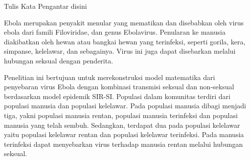 \documentclass{SkripsiUnesa}
\begin{document}
	\linespread{1.15}



\Awal
\HalamanJudul
\SampulDalam
\HalamanPersetujuan
\HalamanPengesahan
\SuratPernyataan
\newpage
\KataPengantar

Tulis Kata Pengantar disini

\begin{Abstrak}
	Ebola merupakan penyakit menular yang mematikan dan disebabkan oleh virus ebola dari famili Filoviridae, dan genus Ebolavirus. Penularan ke manusia diakibatkan oleh hewan atau bangkai hewan yang terinfeksi, seperti gorila, kera, simpanse, kelelawar, dan sebagainya. Virus ini juga dapat disebarkan melalui hubungan seksual dengan penderita.
	
	Penelitian ini bertujuan untuk merekonstruksi model matematika dari penyebaran virus Ebola dengan kombinasi transmisi seksual dan non-seksual berdasarkan model epidemik SIR-SI. Populasi dalam komunitas terdiri dari populasi manusia dan populasi kelelawar. Pada populasi manusia dibagi menjadi tiga, yakni populasi manusia rentan, populasi manusia terinfeksi dan populasi manusia yang telah sembuh. Sedangkan, terdapat dua pada populasi kelelawar yaitu populasi kelelawar rentan dan populasi kelelawar terinfeksi. Pada manusia terinfeksi dapat menyebarkan virus terhadap manusia rentan melalui hubungan seksual. 
\end{Abstrak}
\end{document}
